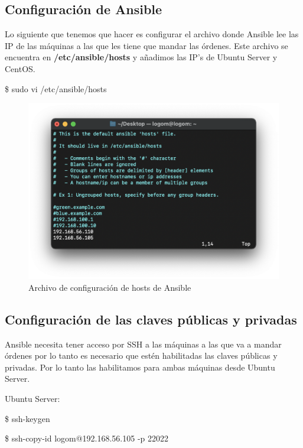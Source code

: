 \subsection{Configuración de Ansible}
Lo siguiente que tenemos que hacer es configurar el archivo donde Ansible lee las IP de las máquinas a las que les tiene que mandar las órdenes. Este archivo
se encuentra en \textbf{/etc/ansible/hosts} y añadimos las IP’s de Ubuntu Server y CentOS.
    \begin{tcolorbox}[colback=black!10, halign=left]
        \$ sudo vi /etc/ansible/hosts
    \end{tcolorbox}
    \begin{figure}[H]
        \centering
        \includegraphics[scale=0.75]{images/ansible_hosts.png}
        \caption{Archivo de configuración de hosts de Ansible}
        \label{fig:ansible_hosts}
    \end{figure}

\subsection{Configuración de las claves públicas y privadas}
Ansible necesita tener acceso por SSH a las máquinas a las que va a mandar órdenes por lo tanto es necesario que estén habilitadas las claves públicas y
privadas. Por lo tanto las habilitamos para ambas máquinas desde Ubuntu Server.

Ubuntu Server:
    \begin{tcolorbox}[colback=black!10, halign=left]
        \$ ssh-keygen
    \end{tcolorbox}
    \begin{tcolorbox}[colback=black!10, halign=left]
        \$ ssh-copy-id logom@192.168.56.105 -p 22022
    \end{tcolorbox}

